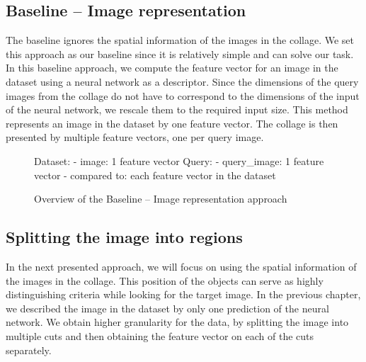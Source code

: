 \subsection{Baseline -- Image representation}

The baseline ignores the spatial information of the images in the collage. We set this approach as our baseline since it is relatively simple and can solve our task. In this baseline approach, we compute the feature vector for an image in the dataset using a neural network as a descriptor. Since the dimensions of the query images from the collage do not have to correspond to the dimensions of the input of the neural network, we rescale them to the required input size. This method represents an image in the dataset by one feature vector. The collage is then presented by multiple feature vectors, one per query image.


\begin{figure}
\centering
\begin{boxedverbatim}
Dataset:
    - image: 1 feature vector
Query:
    - query_image: 1 feature vector
    - compared to: each feature vector in the dataset
\end{boxedverbatim}
\caption{Overview of the Baseline -- Image representation approach}
\end{figure}

\subsection{Splitting the image into regions}

In the next presented approach, we will focus on using the spatial information of the images in the collage. This position of the objects can serve as highly distinguishing criteria while looking for the target image. In the previous chapter, we described the image in the dataset by only one prediction of the neural network. We obtain higher granularity for the data, by splitting the image into multiple cuts and then obtaining the feature vector on each of the cuts separately.

